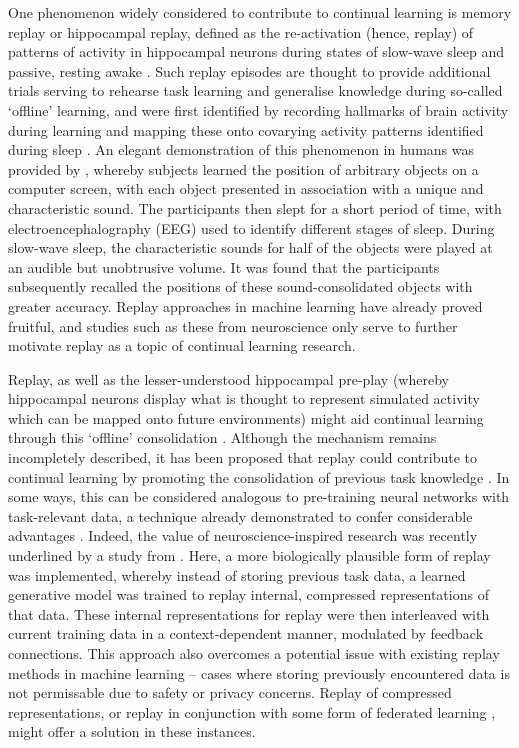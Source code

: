 \documentclass{article} %
\begin{document}
One phenomenon widely considered to contribute to continual learning is memory replay or hippocampal replay, defined as the re-activation (hence, replay) of patterns of activity in hippocampal neurons during states of slow-wave sleep and passive, resting awake \citep{skaggs1996replay,dave2000song,rudoy2009strengthening}. Such replay episodes are thought to provide additional trials serving to rehearse task learning and generalise knowledge during so-called ‘offline’ learning, and were first identified by recording hallmarks of brain activity during learning and mapping these onto covarying activity patterns identified during sleep \citep{rasch2018memory}. An elegant demonstration of this phenomenon in humans was provided by \citet{rudoy2009strengthening}, whereby subjects learned the position of arbitrary objects on a computer screen, with each object presented in association with a unique and characteristic sound. The participants then slept for a short period of time, with electroencephalography (EEG) used to identify different stages of sleep. During slow-wave sleep, the characteristic sounds for half of the objects were played at an audible but unobtrusive volume. It was found that the participants subsequently recalled the positions of these sound-consolidated objects with greater accuracy. Replay approaches in machine learning have already proved fruitful, and studies such as these from neuroscience only serve to further motivate replay as a topic of continual learning research.

Replay, as well as the lesser-understood hippocampal pre-play (whereby hippocampal neurons display what is thought to represent simulated activity which can be mapped onto future environments) might aid continual learning through this ‘offline’ consolidation \citep{dragoi2011preplay,bendor2016does}. Although the mechanism remains incompletely described, it has been proposed that replay could contribute to continual learning by promoting the consolidation of previous task knowledge \citep{olafsdottir2018role}. In some ways, this can be considered analogous to pre-training neural networks with task-relevant data, a technique already demonstrated to confer considerable advantages \citep{erhan2010does} . Indeed, the value of neuroscience-inspired research was recently underlined by a study from \citet{van2020brain}. Here, a more biologically plausible form of replay was implemented, whereby instead of storing previous task data, a learned generative model was trained to replay internal, compressed representations of that data. These internal representations for replay were then interleaved with current training data in a context-dependent manner, modulated by feedback connections. This approach also overcomes a potential issue with existing replay methods in machine learning – cases where storing previously encountered data is not permissable due to safety or privacy concerns. Replay of compressed representations, or replay in conjunction with some form of federated learning \citep{kairouz2019advances}, might offer a solution in these instances.
\end{document}
